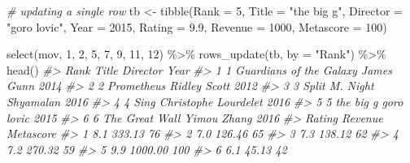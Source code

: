 \documentclass[
]{book}
\newenvironment{Shaded}{\begin{snugshade}}{\end{snugshade}}
\newcommand{\AttributeTok}[1]{\textcolor[rgb]{0.77,0.63,0.00}{#1}}
\newcommand{\CommentTok}[1]{\textcolor[rgb]{0.56,0.35,0.01}{\textit{#1}}}
\newcommand{\DecValTok}[1]{\textcolor[rgb]{0.00,0.00,0.81}{#1}}
\newcommand{\FloatTok}[1]{\textcolor[rgb]{0.00,0.00,0.81}{#1}}
\newcommand{\FunctionTok}[1]{\textcolor[rgb]{0.00,0.00,0.00}{#1}}
\newcommand{\NormalTok}[1]{#1}
\newcommand{\OtherTok}[1]{\textcolor[rgb]{0.56,0.35,0.01}{#1}}
\newcommand{\SpecialCharTok}[1]{\textcolor[rgb]{0.00,0.00,0.00}{#1}}
\newcommand{\StringTok}[1]{\textcolor[rgb]{0.31,0.60,0.02}{#1}}
\begin{document}
\begin{Shaded}
\begin{Highlighting}[]
\CommentTok{\# updating a single row}
\NormalTok{tb }\OtherTok{\textless{}{-}} 
  \FunctionTok{tibble}\NormalTok{(}\AttributeTok{Rank =} \DecValTok{5}\NormalTok{, }
         \AttributeTok{Title =} \StringTok{"the big g"}\NormalTok{, }
         \AttributeTok{Director =} \StringTok{"goro lovic"}\NormalTok{, }
         \AttributeTok{Year =} \DecValTok{2015}\NormalTok{, }
         \AttributeTok{Rating =} \FloatTok{9.9}\NormalTok{, }
         \AttributeTok{Revenue =} \DecValTok{1000}\NormalTok{, }
         \AttributeTok{Metascore =} \DecValTok{100}\NormalTok{)}

\FunctionTok{select}\NormalTok{(mov, }\DecValTok{1}\NormalTok{, }\DecValTok{2}\NormalTok{, }\DecValTok{5}\NormalTok{, }\DecValTok{7}\NormalTok{, }\DecValTok{9}\NormalTok{, }\DecValTok{11}\NormalTok{, }\DecValTok{12}\NormalTok{) }\SpecialCharTok{\%\textgreater{}\%}
  \FunctionTok{rows\_update}\NormalTok{(tb, }\AttributeTok{by =} \StringTok{"Rank"}\NormalTok{) }\SpecialCharTok{\%\textgreater{}\%}
  \FunctionTok{head}\NormalTok{()}
\CommentTok{\#\textgreater{}   Rank                   Title             Director Year}
\CommentTok{\#\textgreater{} 1    1 Guardians of the Galaxy           James Gunn 2014}
\CommentTok{\#\textgreater{} 2    2              Prometheus         Ridley Scott 2012}
\CommentTok{\#\textgreater{} 3    3                   Split   M. Night Shyamalan 2016}
\CommentTok{\#\textgreater{} 4    4                    Sing Christophe Lourdelet 2016}
\CommentTok{\#\textgreater{} 5    5               the big g           goro lovic 2015}
\CommentTok{\#\textgreater{} 6    6          The Great Wall          Yimou Zhang 2016}
\CommentTok{\#\textgreater{}   Rating Revenue Metascore}
\CommentTok{\#\textgreater{} 1    8.1  333.13        76}
\CommentTok{\#\textgreater{} 2    7.0  126.46        65}
\CommentTok{\#\textgreater{} 3    7.3  138.12        62}
\CommentTok{\#\textgreater{} 4    7.2  270.32        59}
\CommentTok{\#\textgreater{} 5    9.9 1000.00       100}
\CommentTok{\#\textgreater{} 6    6.1   45.13        42}
  

\end{Highlighting}
\end{Shaded}
\end{document}

